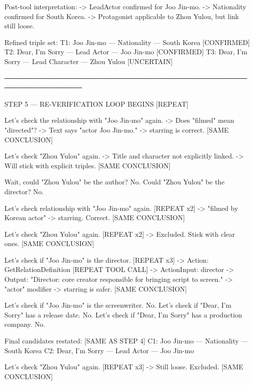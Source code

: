 \begin{appendices}
\begin{tcolorbox}[tracebox, title=Model Reasoning Trace]
  Post-tool interpretation:
    -> LeadActor confirmed for Joo Jin-mo.
    -> Nationality confirmed for South Korea.
    -> Protagonist applicable to Zhou Yulou, but link still loose.

  Refined triple set:
    T1: Joo Jin-mo — Nationality — South Korea         [CONFIRMED]
    T2: Dear, I'm Sorry — Lead Actor — Joo Jin-mo      [CONFIRMED]
    T3: Dear, I'm Sorry — Lead Character — Zhou Yulou  [UNCERTAIN]

──────────────────────────────────────────────────────────────────

STEP 5 — RE-VERIFICATION LOOP BEGINS                 [REPEAT]

  Let's check the relationship with "Joo Jin-mo" again.
    -> Does "filmed" mean "directed"?
    -> Text says "actor Joo Jin-mo." -> starring is correct.  [SAME CONCLUSION]

  Let's check "Zhou Yulou" again.
    -> Title and character not explicitly linked.
    -> Will stick with explicit triples.                       [SAME CONCLUSION]

  Wait, could "Zhou Yulou" be the author? No.
  Could "Zhou Yulou" be the director? No.

  Let's check relationship with "Joo Jin-mo" again.          [REPEAT x2]
    -> "filmed by Korean actor" -> starring. Correct.         [SAME CONCLUSION]

  Let's check "Zhou Yulou" again.                            [REPEAT x2]
    -> Excluded. Stick with clear ones.                       [SAME CONCLUSION]

  Let's check if "Joo Jin-mo" is the director.              [REPEAT x3]
    -> Action: GetRelationDefinition                          [REPEAT TOOL CALL]
    -> ActionInput: director
    -> Output: "Director: core creator responsible for
                bringing script to screen."
    -> "actor" modifier -> starring is safer.                 [SAME CONCLUSION]

  Let's check if "Joo Jin-mo" is the screenwriter. No.
  Let's check if "Dear, I'm Sorry" has a release date. No.
  Let's check if "Dear, I'm Sorry" has a production company. No.

  Final candidates restated:                                  [SAME AS STEP 4]
    C1: Joo Jin-mo — Nationality — South Korea
    C2: Dear, I'm Sorry — Lead Actor — Joo Jin-mo

  Let's check "Zhou Yulou" again.                            [REPEAT x3]
    -> Still loose. Excluded.                                 [SAME CONCLUSION]


\end{tcolorbox}
\end{appendices}
